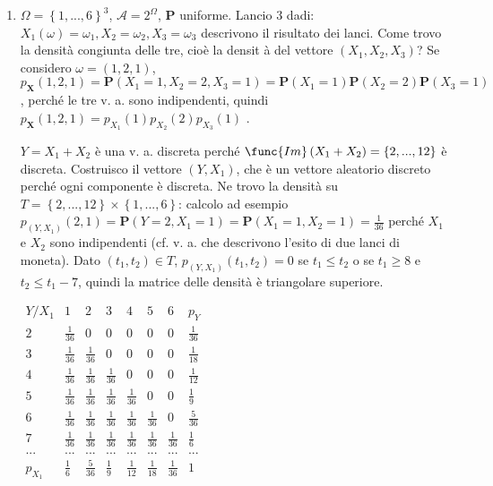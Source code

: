 \documentclass{article}
\begin{document}
\begin{enumerate}
\item $\Omega =\left\{ 1,...,6\right\} ^{3}$, $\mathcal{A}=2^{\Omega }$, $%
\mathbf{P}$ uniforme. Lancio $3$ dadi: $X_{1}\left( \omega \right)
=\omega _{1},X_{2}=\omega _{2},X_{3}=\omega _{3}$ descrivono il risultato
dei lanci. Come trovo la densit\`{a} congiunta delle tre, cio\`{e} la densit%
\`{a} del vettore $\left( X_{1},X_{2},X_{3}\right) $? Se considero $\omega
=\left( 1,2,1\right) $, $p_{\mathbf{X}}\left( 1,2,1\right) =\mathbf{P}\left(
X_{1}=1,X_{2}=2,X_{3}=1\right) =\mathbf{P}\left( X_{1}=1\right) \mathbf{P}%
\left( X_{2}=2\right) \mathbf{P}\left( X_{3}=1\right) $, perch\'{e} le tre
v. a. sono indipendenti, quindi $p_{\mathbf{X}}\left( 1,2,1\right)
=p_{X_{1}}\left( 1\right) p_{X_{2}}\left( 2\right) p_{X_{3}}\left( 1\right) $%
.

$Y=X_{1}+X_{2}$ \`{e} una v. a. discreta perch\'{e} $\func{Im}\left(
X_{1}+X_{2}\right) =\left\{ 2,...,12\right\} $ \`{e} discreta. Costruisco il
vettore $\left( Y,X_{1}\right) $, che \`{e} un vettore aleatorio discreto
perch\'{e} ogni componente \`{e} discreta. Ne trovo la densit\`{a} su $%
T=\left\{ 2,...,12\right\} \times \left\{ 1,...,6\right\} $: calcolo ad
esempio $p_{\left( Y,X_{1}\right) }\left( 2,1\right) =\mathbf{P}\left(
Y=2,X_{1}=1\right) =\mathbf{P}\left( X_{1}=1,X_{2}=1\right) =\frac{1}{36}$
perch\'{e} $X_{1}$ e $X_{2}$ sono indipendenti (cf. v. a. che descrivono
l'esito di due lanci di moneta). Dato $\left( t_{1},t_{2}\right) \in T$, $%
p_{\left( Y,X_{1}\right) }\left( t_{1},t_{2}\right) =0$ se $t_{1}\leq t_{2}$
o se $t_{1}\geq 8$ e $t_{2}\leq t_{1}-7$, quindi la matrice delle densit\`{a}
\`{e} triangolare superiore.

$%
\begin{array}{cccccccc}
Y/X_{1} & 1 & 2 & 3 & 4 & 5 & 6 & p_{Y} \\ 
2 & \frac{1}{36} & 0 & 0 & 0 & 0 & 0 & \frac{1}{36} \\ 
3 & \frac{1}{36} & \frac{1}{36} & 0 & 0 & 0 & 0 & \frac{1}{18} \\ 
4 & \frac{1}{36} & \frac{1}{36} & \frac{1}{36} & 0 & 0 & 0 & \frac{1}{12} \\ 
5 & \frac{1}{36} & \frac{1}{36} & \frac{1}{36} & \frac{1}{36} & 0 & 0 & 
\frac{1}{9} \\ 
6 & \frac{1}{36} & \frac{1}{36} & \frac{1}{36} & \frac{1}{36} & \frac{1}{36}
& 0 & \frac{5}{36} \\ 
7 & \frac{1}{36} & \frac{1}{36} & \frac{1}{36} & \frac{1}{36} & \frac{1}{36}
& \frac{1}{36} & \frac{1}{6} \\ 
... & ... & ... & ... & ... & ... & ... & ... \\ 
p_{X_{1}} & \frac{1}{6} & \frac{5}{36} & \frac{1}{9} & \frac{1}{12} & \frac{1%
}{18} & \frac{1}{36} & 1%
\end{array}%
$


\end{enumerate}
\end{document}
